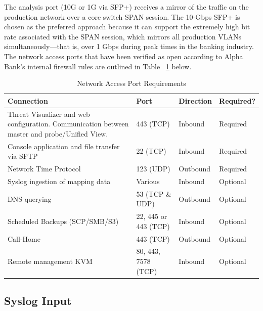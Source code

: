 \documentclass[12pt,a4paper]{report}
\begin{document}
The analysis port (10G or 1G via SFP+) receives a mirror of the traffic on the production network over a core switch SPAN session. The 10-Gbps SFP+ is chosen as the preferred approach because it can support the extremely high bit rate associated with the SPAN session, which mirrors all production VLANs simultaneously—that is, over 1 Gbps during peak times in the banking industry.\\

The network access ports that have been verified as open according to Alpha Bank's internal firewall rules are outlined in Table ~\ref{tab:network-ports} below.


\begin{table}[H]
  \centering
  \captionsetup{singlelinecheck=false, justification=raggedright}
  \caption{Network Access Port Requirements}
  \label{tab:network-ports}
  \renewcommand{\arraystretch}{1.4}
  \begin{tabularx}{\textwidth}{X p{3.2cm} p{2.4cm} p{2.2cm}}
    \toprule
    \textbf{Connection} & \textbf{Port} & \textbf{Direction} & \textbf{Required?} \\
    \midrule
    Threat Visualizer and web configuration. Communication between master and probe/Unified View.
      & 443 (TCP) & Inbound & Required \\
    Console application and file transfer via SFTP
      & 22 (TCP) & Inbound & Required \\
    Network Time Protocol
      & 123 (UDP) & Outbound & Required \\
    Syslog ingestion of mapping data
      & Various & Inbound & Optional \\
    DNS querying
      & 53 (TCP \& UDP) & Outbound & Optional \\
    Scheduled Backups (SCP/SMB/S3)
      & 22, 445 or 443 (TCP) & Inbound & Optional \\
    Call-Home
      & 443 (TCP) & Outbound & Optional \\
    Remote management KVM
      & 80, 443, 7578 (TCP) & Inbound & Optional \\
    \bottomrule
  \end{tabularx}
\end{table}



\normalsize
\vspace{0.3cm}

\subsection{Syslog Input}
\end{document}
